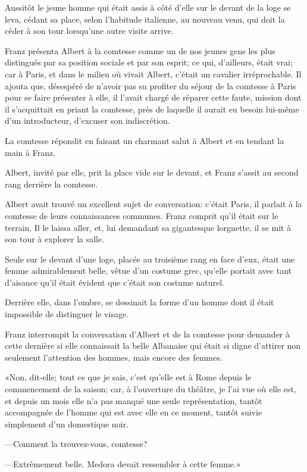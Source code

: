 Aussitôt le jeune homme qui était assis à côté d'elle sur le devant de la loge se leva, cédant sa place, selon l'habitude italienne, au nouveau venu, qui doit la céder à son tour lorsqu'une autre visite arrive. 

Franz présenta Albert à la comtesse comme un de nos jeunes gens les plus distingués par sa position sociale et par son esprit; ce qui, d'ailleurs, était vrai; car à Paris, et dans le milieu où vivait Albert, c'était un cavalier irréprochable. Il ajouta que, désespéré de n'avoir pas su profiter du séjour de la comtesse à Paris pour se faire présenter à elle, il l'avait chargé de réparer cette faute, mission dont il s'acquittait en priant la comtesse, près de laquelle il aurait eu besoin lui-même d'un introducteur, d'excuser son indiscrétion. 

La comtesse répondit en faisant un charmant salut à Albert et en tendant la main à Franz.  

Albert, invité par elle, prit la place vide sur le devant, et Franz s'assit au second rang derrière la comtesse. 

Albert avait trouvé un excellent sujet de conversation: c'était Paris, il parlait à la comtesse de leurs connaissances communes. Franz comprit qu'il était sur le terrain. Il le laissa aller, et, lui demandant sa gigantesque lorgnette, il se mit à son tour à explorer la salle. 

Seule sur le devant d'une loge, placée au troisième rang en face d'eux, était une femme admirablement belle, vêtue d'un costume grec, qu'elle portait avec tant d'aisance qu'il était évident que c'était son costume naturel.  

Derrière elle, dans l'ombre, se dessinait la forme d'un homme dont il était impossible de distinguer le visage. 

Franz interrompit la conversation d'Albert et de la comtesse pour demander à cette dernière si elle connaissait la belle Albanaise qui était si digne d'attirer non seulement l'attention des hommes, mais encore des femmes. 

«Non, dit-elle; tout ce que je sais, c'est qu'elle est à Rome depuis le commencement de la saison; car, à l'ouverture du théâtre, je l'ai vue où elle est, et depuis un mois elle n'a pas manqué une seule représentation, tantôt accompagnée de l'homme qui est avec elle en ce moment, tantôt suivie simplement d'un domestique noir.  

—Comment la trouvez-vous, comtesse? 

—Extrêmement belle. Medora devait ressembler à cette femme.» 

